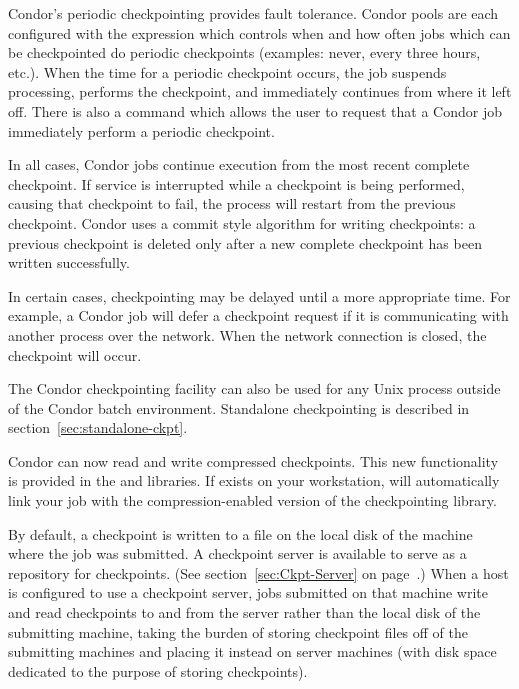 Condor's periodic checkpointing provides fault tolerance.  Condor
pools are each configured with the 
expression which controls when and how often jobs which can be
checkpointed do periodic checkpoints (examples: never, every three
hours, etc.).  When the time for a periodic checkpoint occurs, the job
suspends processing, performs the checkpoint, and immediately
continues from where it left off.  There is also a  command
which allows the user to request that a Condor job immediately perform
a periodic checkpoint.

In all cases, Condor jobs continue execution from the most recent
complete checkpoint.  If service is interrupted while a checkpoint is
being performed, causing that checkpoint to fail, the process will
restart from the previous checkpoint.  Condor uses a commit style
algorithm for writing checkpoints: a previous checkpoint is deleted
only after a new complete checkpoint has been written successfully.

In certain cases, checkpointing may be delayed until a more appropriate
time.  For example, a Condor job will defer a checkpoint request if
it is communicating with another process over the network.  When the
network connection is closed, the checkpoint will occur.

The Condor checkpointing facility can also be used for any Unix process
outside of the Condor batch environment. Standalone checkpointing
is described in section~\ref{sec:standalone-ckpt}.

Condor can now read and write compressed checkpoints.  This new
functionality is provided in the  and
 libraries.  
If  exists on your workstation, 
will automatically link your job with the compression-enabled version
of the checkpointing library.

By default, a checkpoint is written to a file on the local disk of the
machine where the job was submitted.  A checkpoint server is available
to serve as a repository for checkpoints.  (See
section~\ref{sec:Ckpt-Server} on page~\pageref{sec:Ckpt-Server}.)
When a host is configured to use a checkpoint server, jobs submitted
on that machine write and read checkpoints to and from the server
rather than the local disk of the submitting machine, taking the
burden of storing checkpoint files off of the submitting machines and
placing it instead on server machines (with disk space dedicated to
the purpose of storing checkpoints).


